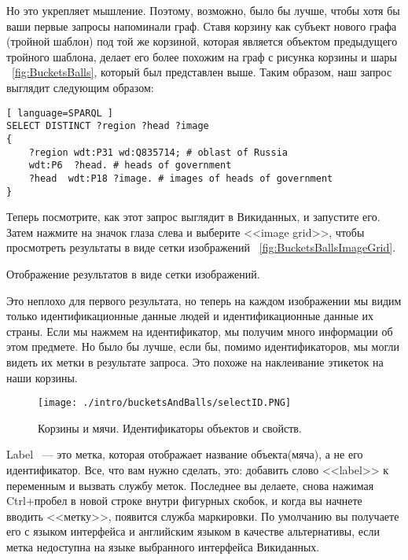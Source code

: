 Но это укрепляет мышление. Поэтому, возможно, было бы лучше, чтобы хотя бы ваши первые запросы напоминали граф. Ставя корзину как субъект нового графа (тройной шаблон) под той же корзиной, которая является объектом предыдущего тройного шаблона, делает его более похожим на граф с рисунка корзины и шары ~\ref{fig:BucketsBalls}, который был представлен выше. Таким образом, наш запрос выглядит следующим образом:

\begin{lstlisting}[ language=SPARQL ]
SELECT DISTINCT ?region ?head ?image
{
    ?region wdt:P31 wd:Q835714; # oblast of Russia
    wdt:P6  ?head. # heads of government
    ?head  wdt:P18 ?image. # images of heads of government
}
\end{lstlisting}

Теперь посмотрите, как этот запрос выглядит в Викиданных, и запустите его. Затем нажмите на значок глаза слева и выберите <<image grid>>, чтобы просмотреть результаты в виде сетки изображений ~\ref{fig:BucketsBallsImageGrid}.

\begin{marginfigure}[-4.5cm]
	{
		\setlength{\fboxsep}{0pt}%
		\setlength{\fboxrule}{1pt}%
	}
    \caption{Отображение результатов в виде сетки изображений.}
	\label{fig:BucketsBallsImageGrid}
\end{marginfigure}

Это неплохо для первого результата, но теперь на каждом изображении мы видим только идентификационные данные людей и идентификационные данные их страны. Если мы нажмем на идентификатор, мы получим много информации об этом предмете. Но было бы лучше, если бы, помимо идентификаторов, мы могли видеть их метки в результате запроса. Это похоже на наклеивание этикеток на наши корзины. 

\begin{figure*}[h!]
\texttt{[image: ./intro/bucketsAndBalls/selectID.PNG]}
\caption{Корзины и мячи. Идентификаторы объектов и свойств.}
\label{fig:BucketsBallsID}
\end{figure*}

Label ~--- это метка, которая отображает название объекта(мяча), а не его идентификатор. Все, что вам нужно сделать, это: добавить слово <<label>> к переменным и вызвать службу меток. Последнее вы делаете, снова нажимая Ctrl+пробел в новой строке внутри фигурных скобок, и когда вы начнете вводить <<метку>>, появится служба маркировки. По умолчанию вы получаете его с языком интерфейса и английским языком в качестве альтернативы, если метка недоступна на языке выбранного интерфейса Викиданных.

